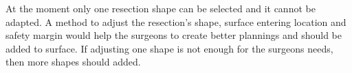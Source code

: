At the moment only one resection shape can be selected and it cannot be adapted.
A method to adjust the resection's shape, surface entering location and safety
margin would help the surgeons to create better plannings and should be added to
surface. If adjusting one shape is not enough for the surgeons needs, then more
shapes should added. 



\endinput
